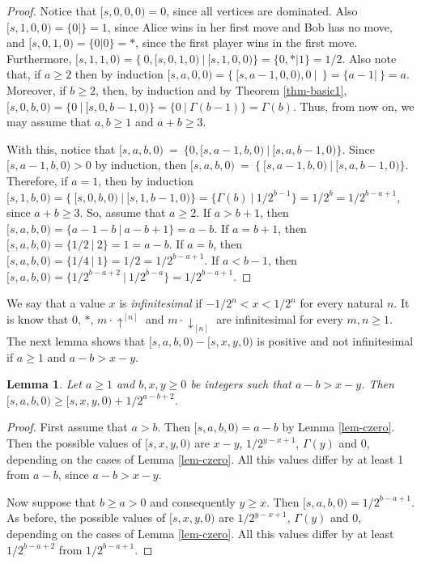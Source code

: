 \documentclass[a4paper,11pt]{article}
\newtheorem{lemma}[theorem]{Lemma}
\begin{document}
\begin{proof}
Notice that $[s,0,0,0)=0$, since all vertices are dominated.
Also $[s,1,0,0)=\{0|\}=1$, since Alice wins in her first move and Bob has no move, and $[s,0,1,0)=\{0|0\}=*$, since the first player wins in the first move.
Furthermore, $[s,1,1,0)=\{\ 0,[s,0,1,0)\ |\ [s,1,0,0)\}=\{0,*|1\}=1/2$.
Also note that, if $a\geq 2$ then by induction $[s,a,0,0)=\{\ [s,a-1,0,0),0\ |\ \ \}=\{a-1|\ \}=a$.
Moreover, if $b\geq 2$, then, by induction and by Theorem \ref{thm-basic1}, $[s,0,b,0)=\{0\ |\ [s,0,b-1,0)\}=\{0\ |\ \Gamma(b-1)\}=\Gamma(b)$.
Thus, from now on, we may assume that $a,b\geq 1$ and $a+b\geq 3$.

With this, notice that
$[s,a,b,0)\ =\ \{0,[s,a-1,b,0)\ |\ [s,a,b-1,0)\}$.
Since $[s,a-1,b,0)>0$ by induction, then
$[s,a,b,0)\ =\ \{\ [s,a-1,b,0)\ |\ [s,a,b-1,0)\}$.
Therefore, if $a=1$, then by induction
$[s,1,b,0)=\{\ [s,0,b,0)\ |\ [s,1,b-1,0)\}=\{\Gamma(b)\ |\ 1/2^{b-1}\}=1/2^b=1/2^{b-a+1}$, since $a+b\geq 3$.
So, assume that $a\geq 2$.
If $a>b+1$, then
$[s,a,b,0)=\{a-1-b\ |\ a-b+1\}=a-b$.
If $a=b+1$, then
$[s,a,b,0)=\{1/2\ |\ 2\}=1=a-b$.
If $a=b$, then
$[s,a,b,0)=\{1/4\ |\ 1\}=1/2=1/2^{b-a+1}$.
If $a<b-1$, then
$[s,a,b,0)=\{1/2^{b-a+2}\ |\ 1/2^{b-a}\}=1/2^{b-a+1}$.
\end{proof}

We say that a value $x$ is \emph{infinitesimal} if $-1/2^n<x<1/2^n$ for every natural $n$. It is know \cite{siegel13} that $0$, $*$, $m\cdot\uparrow^{[n]}$ and $m\cdot\downarrow_{[n]}$ are infinitesimal for every $m,n\geq 1$.
The next lemma shows that $[s,a,b,0)-[s,x,y,0)$ is positive and not infinitesimal if $a\geq 1$ and $a-b>x-y$.

\begin{lemma}\label{lem-czero2}
Let $a\geq 1$ and $b,x,y\geq 0$ be integers such that $a-b>x-y$. Then $[s,a,b,0)\geq[s,x,y,0)+1/2^{a-b+2}$.
\end{lemma}

\begin{proof}
First assume that $a>b$. Then $[s,a,b,0)=a-b$ by Lemma \ref{lem-czero}. Then the possible values of $[s,x,y,0)$ are $x-y$, $1/2^{y-x+1}$, $\Gamma(y)$ and $0$, depending on the cases of Lemma \ref{lem-czero}. All this values differ by at least 1 from $a-b$, since $a-b>x-y$.

Now suppose that $b\geq a>0$ and consequently $y\geq x$. Then $[s,a,b,0)=1/2^{b-a+1}$. As before, the possible values of $[s,x,y,0)$ are $1/2^{y-x+1}$, $\Gamma(y)$ and $0$, depending on the cases of Lemma \ref{lem-czero}. All this values differ by at least $1/2^{b-a+2}$ from $1/2^{b-a+1}$.
\end{proof}
\end{document}

